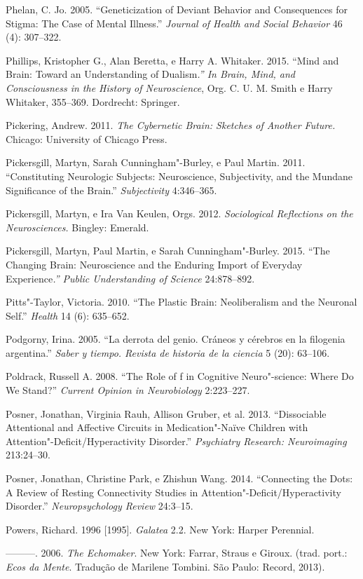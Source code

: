 Phelan, C. Jo. 2005. ``Geneticization of Deviant Behavior and
Consequences for Stigma: The Case of Mental Illness.'' \emph{Journal of
Health and Social Behavior} 46 (4): 307--322.

Phillips, Kristopher G., Alan Beretta, e Harry A. Whitaker. 2015. ``Mind
and Brain: Toward an Understanding of Dualism\emph{.'' In Brain, Mind,
and Consciousness in the History of Neuroscience}, Org. C. U. M. Smith e
Harry Whitaker, 355--369. Dordrecht: Springer.

Pickering, Andrew. 2011. \emph{The Cybernetic Brain: Sketches of Another
Future.} Chicago: University of Chicago Press.

Pickersgill, Martyn, Sarah Cunningham"-Burley, e Paul Martin. 2011.
``Constituting Neurologic Subjects: Neuroscience, Subjectivity, and the
Mundane Significance of the Brain.'' \emph{Subjectivity} 4:346--365.

Pickersgill, Martyn, e Ira Van Keulen, Orgs. 2012. \emph{Sociological
Reflections on the Neurosciences.} Bingley: Emerald.

Pickersgill, Martyn, Paul Martin, e Sarah Cunningham"-Burley. 2015. ``The
Changing Brain: Neuroscience and the Enduring Import of Everyday
Experience\emph{.'' Public Understanding of Science} 24:878--892.

Pitts"-Taylor, Victoria. 2010. ``The Plastic Brain: Neoliberalism and the
Neuronal Self.'' \emph{Health} 14 (6): 635--652.

Podgorny, Irina. 2005. ``La derrota del genio. Cráneos y cérebros en la
filogenia argentina.'' \emph{Saber y tiempo. Revista de historia de la
ciencia} 5 (20): 63--106.

Poldrack, Russell A. 2008. ``The Role of f in Cognitive
Neuro"-science: Where Do We Stand?'' \emph{Current Opinion in
Neurobiology} 2:223--227.

Posner, Jonathan, Virginia Rauh, Allison Gruber, et al. 2013.
``Dissociable Attentional and Affective Circuits in Medication"-Naïve
Children with Attention"-Deficit/Hyperactivity Disorder.''
\emph{Psychiatry Research: Neuroimaging} 213:24--30.

Posner, Jonathan, Christine Park, e Zhishun Wang. 2014. ``Connecting the
Dots: A Review of Resting Connectivity  Studies in
Attention"-Deficit/Hyperactivity Disorder.'' \emph{Neuropsychology
Review} 24:3--15.

Powers, Richard. 1996 {[}1995{]}. \emph{Galatea} 2.2. New York: Harper
Perennial.

---------. 2006. \emph{The Echomaker}. New York: Farrar, Straus e
Giroux. (trad. port.: \emph{Ecos da Mente}. Tradução de Marilene
Tombini. São Paulo: Record, 2013).

